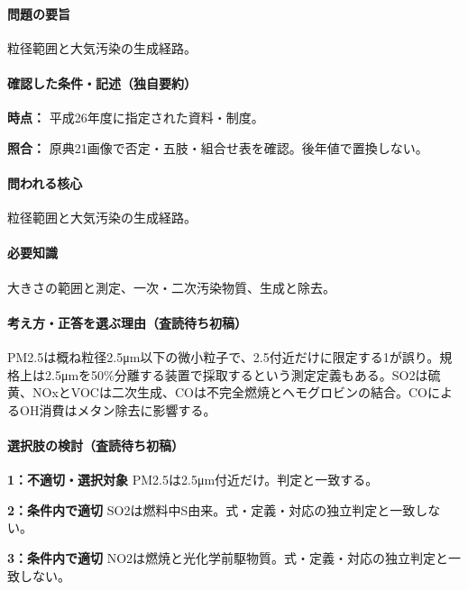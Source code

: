 \paragraph{問題の要旨} 粒径範囲と大気汚染の生成経路。

\paragraph{確認した条件・記述（独自要約）}\mbox{}\par

\noindent\textbf{時点：} 平成26年度に指定された資料・制度。\par

\noindent\textbf{照合：} 原典21画像で否定・五肢・組合せ表を確認。後年値で置換しない。\par

\paragraph{問われる核心} 粒径範囲と大気汚染の生成経路。

\paragraph{必要知識} 大きさの範囲と測定、一次・二次汚染物質、生成と除去。

\paragraph{考え方・正答を選ぶ理由（査読待ち初稿）} PM2.5は概ね粒径2.5μm以下の微小粒子で、2.5付近だけに限定する1が誤り。規格上は2.5μmを50\%分離する装置で採取するという測定定義もある。SO2は硫黄、NOxとVOCは二次生成、COは不完全燃焼とヘモグロビンの結合。COによるOH消費はメタン除去に影響する。

\paragraph{選択肢の検討（査読待ち初稿）}\mbox{}\par

\noindent\textbf{1：不適切・選択対象} PM2.5は2.5μm付近だけ。判定と一致する。\par

\noindent\textbf{2：条件内で適切} SO2は燃料中S由来。式・定義・対応の独立判定と一致しない。\par

\noindent\textbf{3：条件内で適切} NO2は燃焼と光化学前駆物質。式・定義・対応の独立判定と一致しない。\par

